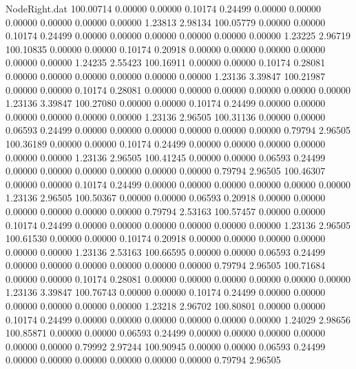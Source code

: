 \begin{filecontents}{NodeRight.dat}
 100.00714    0.00000    0.00000     0.10174    0.24499    0.00000    0.00000    0.00000    0.00000    0.00000    0.00000    1.23813    2.98134
 100.05779    0.00000    0.00000     0.10174    0.24499    0.00000    0.00000    0.00000    0.00000    0.00000    0.00000    1.23225    2.96719
 100.10835    0.00000    0.00000     0.10174    0.20918    0.00000    0.00000    0.00000    0.00000    0.00000    0.00000    1.24235    2.55423
 100.16911    0.00000    0.00000     0.10174    0.28081    0.00000    0.00000    0.00000    0.00000    0.00000    0.00000    1.23136    3.39847
 100.21987    0.00000    0.00000     0.10174    0.28081    0.00000    0.00000    0.00000    0.00000    0.00000    0.00000    1.23136    3.39847
 100.27080    0.00000    0.00000     0.10174    0.24499    0.00000    0.00000    0.00000    0.00000    0.00000    0.00000    1.23136    2.96505
 100.31136    0.00000    0.00000     0.06593    0.24499    0.00000    0.00000    0.00000    0.00000    0.00000    0.00000    0.79794    2.96505
 100.36189    0.00000    0.00000     0.10174    0.24499    0.00000    0.00000    0.00000    0.00000    0.00000    0.00000    1.23136    2.96505
 100.41245    0.00000    0.00000     0.06593    0.24499    0.00000    0.00000    0.00000    0.00000    0.00000    0.00000    0.79794    2.96505
 100.46307    0.00000    0.00000     0.10174    0.24499    0.00000    0.00000    0.00000    0.00000    0.00000    0.00000    1.23136    2.96505
 100.50367    0.00000    0.00000     0.06593    0.20918    0.00000    0.00000    0.00000    0.00000    0.00000    0.00000    0.79794    2.53163
 100.57457    0.00000    0.00000     0.10174    0.24499    0.00000    0.00000    0.00000    0.00000    0.00000    0.00000    1.23136    2.96505
 100.61530    0.00000    0.00000     0.10174    0.20918    0.00000    0.00000    0.00000    0.00000    0.00000    0.00000    1.23136    2.53163
 100.66595    0.00000    0.00000     0.06593    0.24499    0.00000    0.00000    0.00000    0.00000    0.00000    0.00000    0.79794    2.96505
 100.71684    0.00000    0.00000     0.10174    0.28081    0.00000    0.00000    0.00000    0.00000    0.00000    0.00000    1.23136    3.39847
 100.76743    0.00000    0.00000     0.10174    0.24499    0.00000    0.00000    0.00000    0.00000    0.00000    0.00000    1.23218    2.96702
 100.80801    0.00000    0.00000     0.10174    0.24499    0.00000    0.00000    0.00000    0.00000    0.00000    0.00000    1.24029    2.98656
 100.85871    0.00000    0.00000     0.06593    0.24499    0.00000    0.00000    0.00000    0.00000    0.00000    0.00000    0.79992    2.97244
 100.90945    0.00000    0.00000     0.06593    0.24499    0.00000    0.00000    0.00000    0.00000    0.00000    0.00000    0.79794    2.96505

\end{filecontents}
